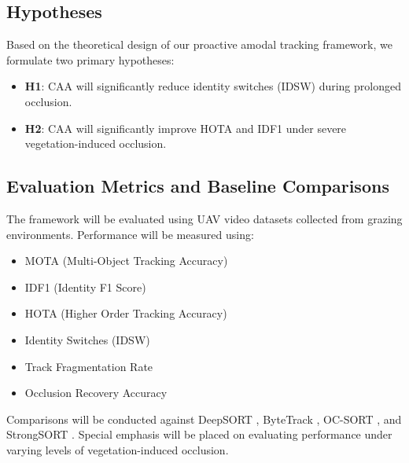 \documentclass[10pt,conference,letterpaper,twocolumn]{article}
\begin{document}
\subsection{Hypotheses}
Based on the theoretical design of our proactive amodal tracking framework, we formulate two primary hypotheses:
\begin{itemize}
    \item \textbf{H1}: CAA will significantly reduce identity switches (IDSW) during prolonged occlusion.
    \item \textbf{H2}: CAA will significantly improve HOTA and IDF1 under severe vegetation-induced occlusion.
\end{itemize}

\subsection{Evaluation Metrics and Baseline Comparisons}
The framework will be evaluated using UAV video datasets collected from grazing environments. Performance will be measured using:
\begin{itemize}
    \item MOTA (Multi-Object Tracking Accuracy)
    \item IDF1 (Identity F1 Score)
    \item HOTA (Higher Order Tracking Accuracy)
    \item Identity Switches (IDSW)
    \item Track Fragmentation Rate
    \item Occlusion Recovery Accuracy
\end{itemize}
Comparisons will be conducted against DeepSORT \cite{wojke2017deepsort}, ByteTrack \cite{zhang2022bytetrack}, OC-SORT \cite{cao2023ocsort}, and StrongSORT \cite{du2023strongsort}. Special emphasis will be placed on evaluating performance under varying levels of vegetation-induced occlusion.
\end{document}
